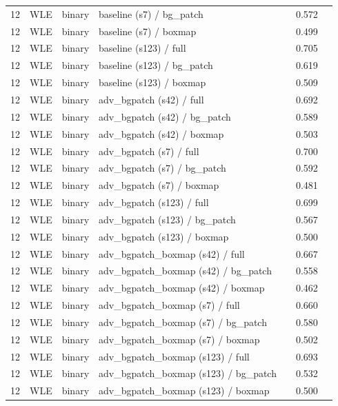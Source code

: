 \begin{longtable}{cL{1.1cm}L{1.5cm}L{5.6cm}ccc}
12 & WLE & binary & baseline (s7) / bg\_patch & \nl{} & 0.572 & \nl{} \\
12 & WLE & binary & baseline (s7) / boxmap & \nl{} & 0.499 & \nl{} \\
12 & WLE & binary & baseline (s123) / full & \nl{} & 0.705 & \nl{} \\
12 & WLE & binary & baseline (s123) / bg\_patch & \nl{} & 0.619 & \nl{} \\
12 & WLE & binary & baseline (s123) / boxmap & \nl{} & 0.509 & \nl{} \\
12 & WLE & binary & adv\_bgpatch (s42) / full & \nl{} & 0.692 & \nl{} \\
12 & WLE & binary & adv\_bgpatch (s42) / bg\_patch & \nl{} & 0.589 & \nl{} \\
12 & WLE & binary & adv\_bgpatch (s42) / boxmap & \nl{} & 0.503 & \nl{} \\
12 & WLE & binary & adv\_bgpatch (s7) / full & \nl{} & 0.700 & \nl{} \\
12 & WLE & binary & adv\_bgpatch (s7) / bg\_patch & \nl{} & 0.592 & \nl{} \\
12 & WLE & binary & adv\_bgpatch (s7) / boxmap & \nl{} & 0.481 & \nl{} \\
12 & WLE & binary & adv\_bgpatch (s123) / full & \nl{} & 0.699 & \nl{} \\
12 & WLE & binary & adv\_bgpatch (s123) / bg\_patch & \nl{} & 0.567 & \nl{} \\
12 & WLE & binary & adv\_bgpatch (s123) / boxmap & \nl{} & 0.500 & \nl{} \\
12 & WLE & binary & adv\_bgpatch\_boxmap (s42) / full & \nl{} & 0.667 & \nl{} \\
12 & WLE & binary & adv\_bgpatch\_boxmap (s42) / bg\_patch & \nl{} & 0.558 & \nl{} \\
12 & WLE & binary & adv\_bgpatch\_boxmap (s42) / boxmap & \nl{} & 0.462 & \nl{} \\
12 & WLE & binary & adv\_bgpatch\_boxmap (s7) / full & \nl{} & 0.660 & \nl{} \\
12 & WLE & binary & adv\_bgpatch\_boxmap (s7) / bg\_patch & \nl{} & 0.580 & \nl{} \\
12 & WLE & binary & adv\_bgpatch\_boxmap (s7) / boxmap & \nl{} & 0.502 & \nl{} \\
12 & WLE & binary & adv\_bgpatch\_boxmap (s123) / full & \nl{} & 0.693 & \nl{} \\
12 & WLE & binary & adv\_bgpatch\_boxmap (s123) / bg\_patch & \nl{} & 0.532 & \nl{} \\
12 & WLE & binary & adv\_bgpatch\_boxmap (s123) / boxmap & \nl{} & 0.500 & \nl{} \\

\end{longtable}

